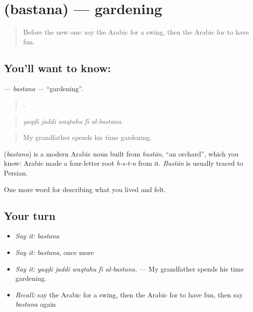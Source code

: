 \section[\texorpdfstring{\ar{بستنة} (bastana)}{بستنة (bastana)}]{ (bastana) — gardening}

\label{lesson:AR-C539-bastana}



\begin{quote}
Before the new one: say the Arabic for a swing, then the Arabic for to have fun.
\end{quote}

\subsection*{You'll want to know: }
\textbf{} — \emph{bastana} — \textquotedblleft{}gardening\textquotedblright{}.

\begin{quote}
    .
\end{quote}

\begin{quote}
\emph{yaqḍī jaddī waqtahu fī al-bastana.}
\end{quote}

\begin{quote}
My grandfather spends his time gardening.
\end{quote}

\begin{cousinweb}
\textbf{} (\emph{bastana}) is a modern Arabic noun built from \emph{bustān}, \textquotedblleft{}an orchard\textquotedblright{}, which you know: Arabic made a four-letter root \emph{b-s-t-n} from it. \emph{Bustān} is usually traced to Persian.
\end{cousinweb}

\begin{grammarlens}[title={What you've built}]
One more word for describing what you lived and felt.
\end{grammarlens}

\subsection*{Your turn}
\begin{itemize}
\raggedright
  \item \emph{Say it:} \emph{bastana}
  \item \emph{Say it:} \emph{bastana}, once more
  \item \emph{Say it:} \emph{yaqḍī jaddī waqtahu fī al-bastana.} — My grandfather spends his time gardening.
  \item \emph{Recall:} say the Arabic for a swing, then the Arabic for to have fun, then say \emph{bastana} again
\end{itemize}

